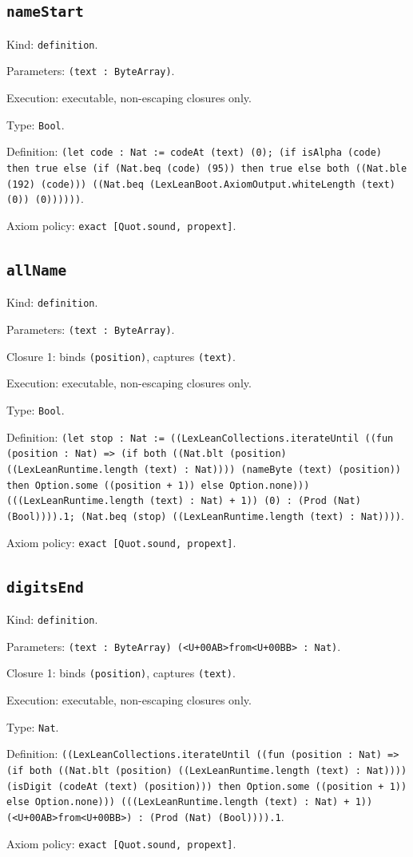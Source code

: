 \documentclass[11pt]{article}
\begin{document}
\subsection*{\texttt{nameStart}}
\noindent Kind: \texttt{definition}.\par
\noindent Parameters: \texttt{(text : ByteArray)}.\par
\noindent Execution: executable, non-escaping closures only.\par
\noindent Type: \texttt{Bool}.\par
\noindent Definition: \texttt{(let code : Nat := codeAt (text) (0); (if isAlpha (code) then true else (if (Nat.beq (code) (95)) then true else both ((Nat.ble (192) (code))) ((Nat.beq (LexLeanBoot.AxiomOutput.whiteLength (text) (0)) (0))))))}.\par
\noindent Axiom policy: \texttt{exact [Quot.sound, propext]}.\par
\subsection*{\texttt{allName}}
\noindent Kind: \texttt{definition}.\par
\noindent Parameters: \texttt{(text : ByteArray)}.\par
\noindent Closure 1: binds \texttt{(position)}, captures \texttt{(text)}.\par
\noindent Execution: executable, non-escaping closures only.\par
\noindent Type: \texttt{Bool}.\par
\noindent Definition: \texttt{(let stop : Nat := ((LexLeanCollections.iterateUntil ((fun (position : Nat) => (if both ((Nat.blt (position) ((LexLeanRuntime.length (text) : Nat)))) (nameByte (text) (position)) then Option.some ((position + 1)) else Option.none))) (((LexLeanRuntime.length (text) : Nat) + 1)) (0) : (Prod (Nat) (Bool)))).1; (Nat.beq (stop) ((LexLeanRuntime.length (text) : Nat))))}.\par
\noindent Axiom policy: \texttt{exact [Quot.sound, propext]}.\par
\subsection*{\texttt{digitsEnd}}
\noindent Kind: \texttt{definition}.\par
\noindent Parameters: \texttt{(text : ByteArray) (<U+00AB>from<U+00BB> : Nat)}.\par
\noindent Closure 1: binds \texttt{(position)}, captures \texttt{(text)}.\par
\noindent Execution: executable, non-escaping closures only.\par
\noindent Type: \texttt{Nat}.\par
\noindent Definition: \texttt{((LexLeanCollections.iterateUntil ((fun (position : Nat) => (if both ((Nat.blt (position) ((LexLeanRuntime.length (text) : Nat)))) (isDigit (codeAt (text) (position))) then Option.some ((position + 1)) else Option.none))) (((LexLeanRuntime.length (text) : Nat) + 1)) (<U+00AB>from<U+00BB>) : (Prod (Nat) (Bool)))).1}.\par
\noindent Axiom policy: \texttt{exact [Quot.sound, propext]}.\par
\end{document}
